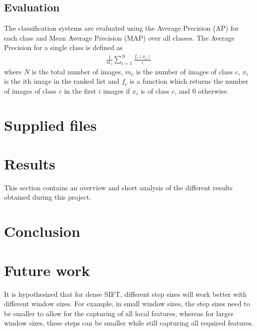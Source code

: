 \documentclass{article} %
\begin{document}
\subsection{Evaluation}
The classification systems are evaluated using the Average Precision (AP) for each class and Mean Average Precision (MAP) over all classes. The Average Precision for a single class is defined as
\begin{align}
\frac{1}{m_c} \sum\limits_{i=1}^N\frac{f_c(x_i)}{i}
\end{align}
where $N$ is the total number of images, $m_c$ is the number of images of class $c$, $x_i$ is the ith image in the ranked list and $f_c$ is a function which returns the number of images of class $c$ in the first $i$ images if $x_i$ is of class $c$, and 0 otherwise.

\section{Supplied files}


\section{Results}
This section contains an overview and short analysis of the different results obtained during this project. \\


\section{Conclusion}

\section{Future work}
It is hypothesized that for dense SIFT, different step sizes will work better with different window sizes. For example, in small window sizes, the step sizes need to be smaller to allow for the capturing of all local features, whereas for larger window sizes, these steps can be smaller while still capturing all required features.



\end{document}
